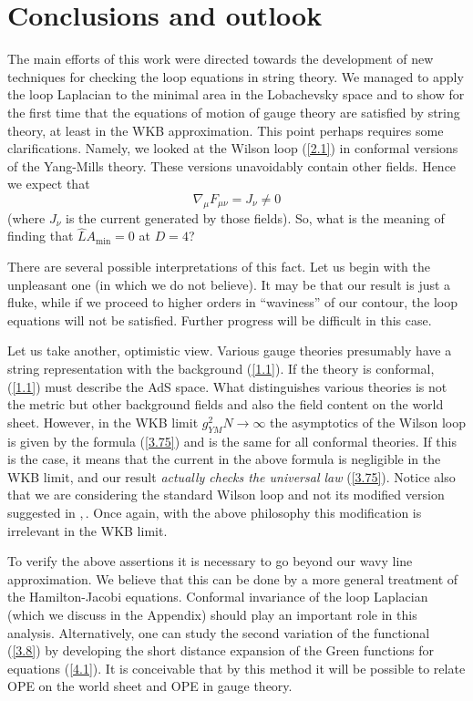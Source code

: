\documentclass[a4paper,12pt]{article}
\numberwithin{equation}{section}
\begin{document}
\section{Conclusions and outlook}

The main efforts of this work were directed towards the development of new techniques
for checking the loop equations in string theory. We managed to apply the loop
Laplacian to the minimal area in the Lobachevsky space and to show for the first
time that the equations of motion of gauge theory are satisfied by string theory,
at least in the WKB approximation. This point perhaps requires some clarifications.
Namely, we looked at the Wilson loop (\ref{2.1}) in conformal versions of the
Yang-Mills theory. These versions unavoidably contain other fields. Hence we
expect that 
\[
\nabla _{\mu }F_{\mu \nu }=J_{\nu }\ne 0\]
(where \( J_{\nu } \) is the current generated by those fields). So, what is
the meaning of finding that \( \widehat{L}A_{\min }=0 \) at \( D=4 \)? 

There are several possible interpretations of this fact. Let us begin with the
unpleasant one (in which we do not believe). It may be that our result is just
a fluke, while if we proceed to higher orders in ``waviness'' of our contour,
the loop equations will not be satisfied. Further progress will be difficult
in this case.

Let us take another, optimistic view. Various gauge theories presumably have
a string representation with the background (\ref{1.1}). If the theory is conformal,
(\ref{1.1}) must describe the AdS space. What distinguishes various theories
is not the metric but other background fields and also the field content on
the world sheet. However, in the WKB limit \( g_{YM}^{2}N\to \infty  \) the
asymptotics of the Wilson loop is given by the formula (\ref{3.75}) and is
the same for all conformal theories. If this is the case, it means that the
current in the above formula is negligible in the WKB limit, and our result
\emph{actually checks the universal law} (\ref{3.75}). Notice also that we
are considering the standard Wilson loop and not its modified version suggested
in \cite{13},\,\cite{14}. Once again, with the above philosophy this modification
is irrelevant in the WKB limit. 

To verify the above assertions it is necessary to go beyond our wavy line approximation.
We believe that this can be done by a more general treatment of the Hamilton-Jacobi
equations. Conformal invariance of the loop Laplacian (which we discuss in the
Appendix) should play an important role in this analysis. Alternatively, one
can study the second variation of the functional (\ref{3.8}) by developing
the short distance expansion of the Green functions for equations (\ref{4.1}).
It is conceivable that by this method it will be possible to relate OPE on the
world sheet and OPE in gauge theory. 
\end{document}
